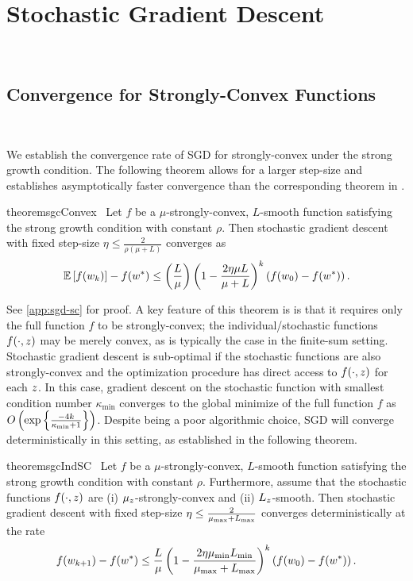 
\chapter{Stochastic Gradient Descent}~\label{ch:sgd}


\section{Convergence for Strongly-Convex Functions}~\label{sec:sgd-sc}

We establish the convergence rate of SGD for strongly-convex under the strong growth condition. 
The following theorem allows for a larger step-size and establishes asymptotically faster convergence than the corresponding theorem in \citet{vaswani2019fast}.

\begin{restatable}{theorem}{sgcConvex}~\label{thm:sgc-convex}
    Let \( f \) be a \( \mu \)-strongly-convex, \( L \)-smooth function satisfying the strong growth condition with constant \( \rho \).
    Then stochastic gradient descent with fixed step-size \( \eta \leq \frac{2}{\rho(\mu + L)} \) converges as 
    \[ \mathbb{E}\left[f(w_k)\right] - f(w^*) \leq \left(\frac{L}{\mu}\right)\left(1 - \frac{2\eta \mu L}{\mu + L}\right)^k \left(f(w_0) - f(w^*)\right). \] 
\end{restatable}

See \autoref{app:sgd-sc} for proof.
A key feature of this theorem is is that it requires only the full function \( f \) to be strongly-convex; the individual/stochastic functions \( f(\cdot, z) \) may be merely convex, as is typically the case in the finite-sum setting.
Stochastic gradient descent is sub-optimal if the stochastic functions are also strongly-convex and the optimization procedure has direct access to \( f(\cdot, z ) \) for each \( z \).
In this case, gradient descent on the stochastic function with smallest condition number \( \kappa_{\text{min}} \) converges to the global minimize of the full function \( f \) as \( O\left(\exp\left\{\frac{-4 k}{\kappa_{\text{min}} + 1}\right\}\right) \).
Despite being a poor algorithmic choice, SGD will converge deterministically in this setting, as established in the following theorem.

\begin{restatable}{theorem}{sgcIndSC}~\label{thm:sgc-ind-sc}
    Let \( f \) be a \( \mu \)-strongly-convex, \( L \)-smooth function satisfying the strong growth condition with constant \( \rho \).
    Furthermore, assume that the stochastic functions \( f(\cdot, z) \) are (i) \( \mu_z \)-strongly-convex and (ii) \( L_z \)-smooth.
    Then stochastic gradient descent with fixed step-size \( \eta \leq \frac{2}{\mu_{\text{max}} + L_{\text{max}}} \) converges deterministically at the rate 
    \[ f(w_{k+1}) - f(w^*) \leq \frac{L}{\mu} \left(1 - \frac{2 \eta \mu_{\text{min}} L_{\text{min}}}{\mu_{\text{max}} + L_{\text{max}}}\right)^k \left(f(w_0) - f(w^*)\right). \] 
\end{restatable}


